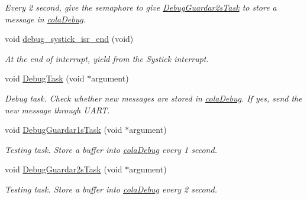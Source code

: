 \begin{DoxyCompactItemize}
\begin{DoxyCompactList}\small\item\em Every 2 second, give the semaphore to give \hyperlink{group___debug___exported___functions___group3_gadc8fe8277ada7992dddff220a145eb5f}{Debug\+Guardar2s\+Task} to store a message in \hyperlink{group___cola_ga314fd637d927bd6a2551e119de623aa5}{cola\+Debug}. \end{DoxyCompactList}\item 
void \hyperlink{group___debug___exported___functions___group3_ga90fc436c03b0762c7f071168e53ef0de}{debug\+\_\+systick\+\_\+isr\+\_\+end} (void)\hypertarget{group___debug___exported___functions___group3_ga90fc436c03b0762c7f071168e53ef0de}{}\label{group___debug___exported___functions___group3_ga90fc436c03b0762c7f071168e53ef0de}

\begin{DoxyCompactList}\small\item\em At the end of interrupt, yield from the Systick interrupt. \end{DoxyCompactList}\item 
void \hyperlink{group___debug___exported___functions___group3_ga0e7fca846e34e06a1f62249fe8a30a44}{Debug\+Task} (void $\ast$argument)
\begin{DoxyCompactList}\small\item\em Debug task. Check whether new messages are stored in \hyperlink{group___cola_ga314fd637d927bd6a2551e119de623aa5}{cola\+Debug}. If yes, send the new message through U\+A\+RT. \end{DoxyCompactList}\item 
void \hyperlink{group___debug___exported___functions___group3_ga5e54537eed1694dae3ea8e6cce3f9b3a}{Debug\+Guardar1s\+Task} (void $\ast$argument)
\begin{DoxyCompactList}\small\item\em Testing task. Store a buffer into \hyperlink{group___cola_ga314fd637d927bd6a2551e119de623aa5}{cola\+Debug} every 1 second. \end{DoxyCompactList}\item 
void \hyperlink{group___debug___exported___functions___group3_gadc8fe8277ada7992dddff220a145eb5f}{Debug\+Guardar2s\+Task} (void $\ast$argument)
\begin{DoxyCompactList}\small\item\em Testing task. Store a buffer into \hyperlink{group___cola_ga314fd637d927bd6a2551e119de623aa5}{cola\+Debug} every 2 second. \end{DoxyCompactList}\end{DoxyCompactItemize}


